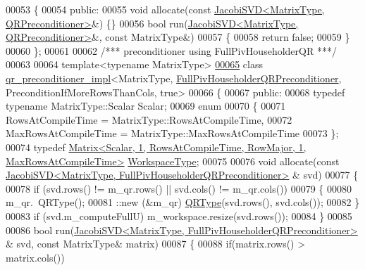 \begin{DoxyCode}
00053 \{
00054 \textcolor{keyword}{public}:
00055   \textcolor{keywordtype}{void} allocate(\textcolor{keyword}{const} \hyperlink{group___s_v_d___module_class_eigen_1_1_jacobi_s_v_d}{JacobiSVD<MatrixType, QRPreconditioner>}&) \{\}
00056   \textcolor{keywordtype}{bool} run(\hyperlink{group___s_v_d___module_class_eigen_1_1_jacobi_s_v_d}{JacobiSVD<MatrixType, QRPreconditioner>}&, \textcolor{keyword}{const} 
      MatrixType&)
00057   \{
00058     \textcolor{keywordflow}{return} \textcolor{keyword}{false};
00059   \}
00060 \};
00061 
00062 \textcolor{comment}{/*** preconditioner using FullPivHouseholderQR ***/}
00063 
00064 \textcolor{keyword}{template}<\textcolor{keyword}{typename} MatrixType>
\hyperlink{class_eigen_1_1internal_1_1qr__preconditioner__impl_3_01_matrix_type_00_01_full_piv_householder_b68efcf0da0383d73ce7fb20aafa2293}{00065} \textcolor{keyword}{class }\hyperlink{struct_eigen_1_1internal_1_1qr__preconditioner__impl}{qr\_preconditioner\_impl}<MatrixType, 
      \hyperlink{group__enums_gga46eba0d5c621f590b8cf1b53af31d56ea566c44ba828dea7f5d2fb174d799d5d2}{FullPivHouseholderQRPreconditioner}, PreconditionIfMoreRowsThanCols, true>
00066 \{
00067 \textcolor{keyword}{public}:
00068   \textcolor{keyword}{typedef} \textcolor{keyword}{typename} MatrixType::Scalar Scalar;
00069   \textcolor{keyword}{enum}
00070   \{
00071     RowsAtCompileTime = MatrixType::RowsAtCompileTime,
00072     MaxRowsAtCompileTime = MatrixType::MaxRowsAtCompileTime
00073   \};
00074   \textcolor{keyword}{typedef} 
      \hyperlink{group___core___module}{Matrix<Scalar, 1, RowsAtCompileTime, RowMajor, 1, MaxRowsAtCompileTime>}
       \hyperlink{group___core___module}{WorkspaceType};
00075 
00076   \textcolor{keywordtype}{void} allocate(\textcolor{keyword}{const} \hyperlink{group___s_v_d___module_class_eigen_1_1_jacobi_s_v_d}{JacobiSVD<MatrixType, FullPivHouseholderQRPreconditioner>}
      & svd)
00077   \{
00078     \textcolor{keywordflow}{if} (svd.rows() != m\_qr.rows() || svd.cols() != m\_qr.cols())
00079     \{
00080       m\_qr.~QRType();
00081       ::new (&m\_qr) \hyperlink{group___q_r___module}{QRType}(svd.rows(), svd.cols());
00082     \}
00083     \textcolor{keywordflow}{if} (svd.m\_computeFullU) m\_workspace.resize(svd.rows());
00084   \}
00085 
00086   \textcolor{keywordtype}{bool} run(\hyperlink{group___s_v_d___module_class_eigen_1_1_jacobi_s_v_d}{JacobiSVD<MatrixType, FullPivHouseholderQRPreconditioner>}
      & svd, \textcolor{keyword}{const} MatrixType& matrix)
00087   \{
00088     \textcolor{keywordflow}{if}(matrix.rows() > matrix.cols())

\end{DoxyCode}
